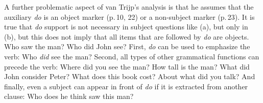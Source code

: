 A further problematic aspect of van Trijp's analysis is that he assumes that the auxiliary \emph{do}
is an object marker (p.\,10, 22) or a non-subject marker (p.\,23). It is true that \emph{do} support is not necessary in subject questions like
(a), but only in (b), but this does not imply that all items that are followed by
\emph{do} are objects.
\eal
\ex Who saw the man?
\ex Who did John see?
\zl
First, \emph{do} can be used to emphasize the verb:
\ea
Who \emph{did} see the man?
\z
Second, all types of other grammatical functions can precede the verb:
\eal
\settowidth{}
\ex Where did you see the man? 
\ex How tall is the man? 
\ex What did John consider Peter? 
\ex What does this book cost? 
\ex About what did you talk? 
\zl
And finally, even a subject can appear in front of \emph{do} if it is extracted from another clause:
\ea
\settowidth{}
Who does he think saw this man? 
\z
%
%

